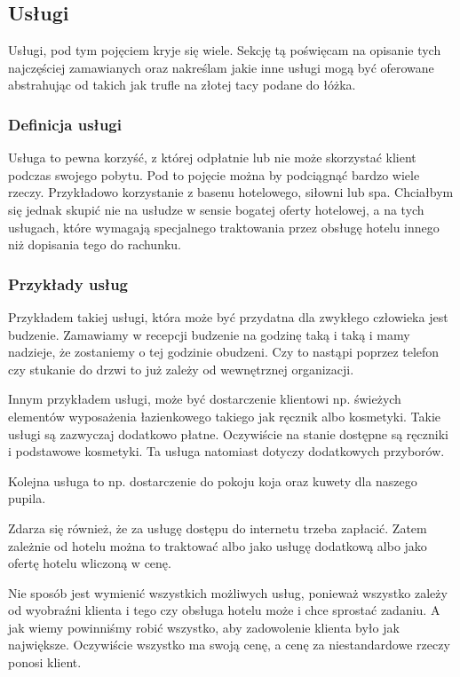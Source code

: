 \documentclass[a4paper,onecolumn,oneside,11pt,wide,floatssmall]{mwrep}
\theoremstyle{definition}
\theoremstyle{plain}%
\theoremstyle{remark}
\begin{document}
\subsection{Usługi}
Usługi, pod tym pojęciem kryje się wiele. Sekcję tą poświęcam na opisanie tych
najczęściej zamawianych oraz nakreślam jakie inne usługi mogą być oferowane
abstrahując od takich jak trufle na złotej tacy podane do łóżka.

\subsubsection{Definicja usługi}
Usługa to pewna korzyść, z której odpłatnie lub nie może skorzystać klient
podczas swojego pobytu. Pod to pojęcie można by podciągnąć bardzo wiele rzeczy.
Przykładowo korzystanie z basenu hotelowego, siłowni lub spa. Chciałbym się
jednak skupić nie na usłudze w sensie bogatej oferty hotelowej, a na tych
usługach, które wymagają specjalnego traktowania przez obsługę hotelu innego niż
dopisania tego do rachunku.
\subsubsection{Przykłady usług}
Przykładem takiej usługi, która może być przydatna dla zwykłego człowieka jest
budzenie. Zamawiamy w recepcji budzenie na godzinę taką i taką i mamy nadzieje,
że zostaniemy o tej godzinie obudzeni. Czy to nastąpi poprzez telefon czy
stukanie do drzwi to już zależy od wewnętrznej organizacji.

Innym przykładem usługi, może być dostarczenie klientowi np. świeżych elementów
wyposażenia łazienkowego takiego jak ręcznik albo kosmetyki. Takie usługi są
zazwyczaj dodatkowo płatne. Oczywiście na stanie dostępne są ręczniki i
podstawowe kosmetyki. Ta usługa natomiast dotyczy dodatkowych przyborów.

Kolejna usługa to np. dostarczenie do pokoju koja oraz kuwety dla naszego
pupila.

Zdarza się również, że za usługę dostępu do internetu trzeba zapłacić. Zatem
zależnie od hotelu można to traktować albo jako usługę dodatkową albo jako
ofertę hotelu wliczoną w cenę.

Nie sposób jest wymienić wszystkich możliwych usług, ponieważ wszystko zależy od
wyobraźni klienta i tego czy obsługa hotelu może i chce sprostać zadaniu. A jak
wiemy powinniśmy robić wszystko, aby zadowolenie klienta było jak największe.
Oczywiście wszystko ma swoją cenę, a cenę za niestandardowe rzeczy ponosi
klient.
\end{document}
